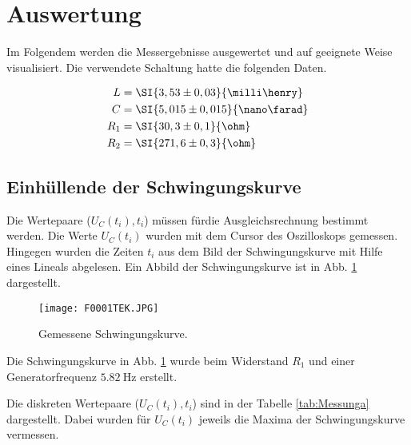



\section{Auswertung}

Im Folgendem werden die Messergebnisse ausgewertet und auf geeignete Weise
visualisiert.
Die verwendete Schaltung hatte die folgenden Daten.

\begin{align*}
  L &= \SI{3,53\pm 0,03}{\milli\henry} \\
  C &= \SI{5,015\pm 0,015}{\nano\farad} \\
  R_1 &= \SI{30,3\pm 0,1}{\ohm} \\
  R_2 &= \SI{271,6\pm 0,3}{\ohm}
\end{align*}

\subsection{Einhüllende der Schwingungskurve}

Die Wertepaare ($U_C(t_i), t_i$) müssen fürdie Ausgleichsrechnung bestimmt werden.
Die Werte $U_C(t_i)$ wurden mit dem Cursor des Oszilloskops gemessen.
Hingegen wurden die Zeiten $t_i$ aus dem Bild der Schwingungskurve mit
Hilfe eines Lineals abgelesen. Ein Abbild der Schwingungskurve ist in Abb.
\ref{fig:Schwingungskurve} dargestellt.

\begin{figure}
  \centering
  \texttt{[image: F0001TEK.JPG]}
  \caption{Gemessene Schwingungskurve.}
  \label{fig:Schwingungskurve}
\end{figure}

Die Schwingungskurve in Abb. \ref{fig:Schwingungskurve} wurde beim
Widerstand $R_1$ und einer Generatorfrequenz $\SI{5,82}{\hertz}$ erstellt.

Die diskreten Wertepaare ($U_C(t_i), t_i$) sind in der Tabelle \ref{tab:Messunga}
dargestellt. Dabei wurden für $U_C(t_i)$ jeweils die Maxima der Schwingungskurve
vermessen.

